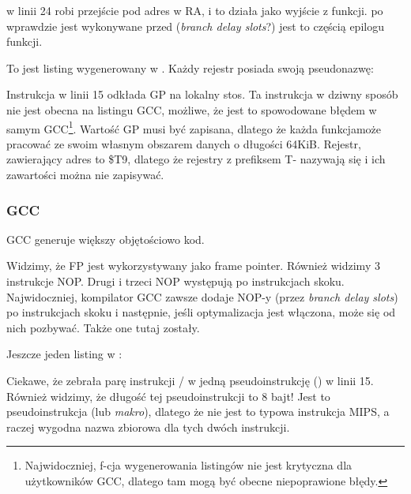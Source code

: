  w linii 24 robi przejście pod adres w \ac{RA}, i to działa jako wyjście z funkcji.
 po  wprawdzie jest wykonywane przed  (\emph{branch delay slots}?) 
jest to częścią epilogu funkcji.

To jest listing wygenerowany w \IDA. Każdy rejestr posiada swoją pseudonazwę:



Instrukcja w linii 15 odkłada GP na lokalny stos. Ta instrukcja w dziwny sposób nie jest obecna na listingu GCC, możliwe, że jest to spowodowane błędem w samym GCC\footnote{Najwidoczniej, f-cja wygenerowania listingów nie jest krytyczna
dla użytkowników GCC, dlatego tam mogą być obecne niepoprawione błędy.}.
Wartość GP musi być zapisana, dlatego że każda funkcjamoże pracować ze swoim własnym obszarem danych o długości 64KiB.
Rejestr, zawierający adres \puts to \$T9, dlatego że rejestry z prefiksem T- nazywają się
 i ich zawartości można nie zapisywać.

\subsubsection{\NonOptimizing GCC}

\NonOptimizing GCC generuje większy objętościowo kod.



Widzimy, że FP jest wykorzystywany jako frame pointer.
Również widzimy 3 instrukcje \ac{NOP}.
Drugi i trzeci \ac{NOP} występują po instrukcjach skoku.
Najwidoczniej, kompilator GCC zawsze dodaje \ac{NOP}-y (przez \emph{branch delay slots})
po instrukcjach skoku i następnie, jeśli optymalizacja jest włączona, może się od nich pozbywać.
Także one tutaj zostały.

Jeszcze jeden listing w \IDA:



Ciekawe, że \IDA zebrała parę instrukcji / w jedną pseudoinstrukcję 
 () w linii 15.
Również widzimy, że długość tej pseudoinstrukcji to 8 bajt!
Jest to pseudoinstrukcja (lub \emph{makro}), dlatego że nie jest to typowa instrukcja MIPS, a raczej wygodna nazwa zbiorowa dla tych dwóch instrukcji.

